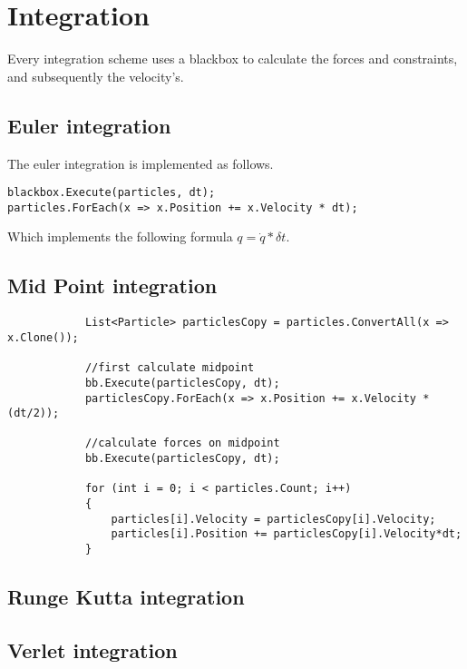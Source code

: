 \chapter{Integration} 
Every integration scheme uses a blackbox to calculate the forces and constraints, and subsequently the velocity's. 

\section{Euler integration}
The euler integration is implemented as follows.
\begin{lstlisting}
blackbox.Execute(particles, dt);
particles.ForEach(x => x.Position += x.Velocity * dt);
\end{lstlisting}
Which implements the following formula $q = \dot{q}*\delta t$.

\section{Mid Point integration}
\begin{lstlisting}
			List<Particle> particlesCopy = particles.ConvertAll(x => x.Clone());

			//first calculate midpoint
			bb.Execute(particlesCopy, dt);
			particlesCopy.ForEach(x => x.Position += x.Velocity * (dt/2));

			//calculate forces on midpoint
			bb.Execute(particlesCopy, dt);

			for (int i = 0; i < particles.Count; i++)
			{
				particles[i].Velocity = particlesCopy[i].Velocity;
				particles[i].Position += particlesCopy[i].Velocity*dt;
			}
\end{lstlisting}

\section{Runge Kutta integration}

\section{Verlet integration}
